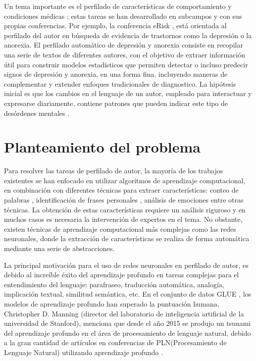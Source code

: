 Un tema importante es el perfilado de características de comportamiento \citep{kumar2018aggression} y condiciones médicas \citep{de2013predicting}; estas tareas se han desarrollado en subcampos y con sus propias conferencias. Por ejemplo, la conferencia eRisk \citep{Losada2018}, está orientada al perfilado del autor en búsqueda de evidencia de trastornos como la depresión o la anorexia. El perfilado automático de depresión y anorexia consiste en recopilar una serie de textos de diferentes autores, con el objetivo de extraer información útil para construir modelos estadísticos que permiten detectar o incluso predecir signos de depresión y anorexia, en una forma fina, incluyendo maneras de complementar y extender enfoques tradicionales de diagnostico. La hipótesis inicial es que los cambios en el lenguaje de un autor, empleado para interactuar y expresarse diariamente, contiene patrones que pueden indicar este tipo de desórdenes mentales \cite{de2013predicting}.



\section{Planteamiento del problema}

Para resolver las tareas de perfilado de autor, la mayoría de los trabajos existentes se han enfocado en utilizar algoritmos de aprendizaje computacional, en combinación con diferentes técnicas para extraer características: conteo de palabras \citep{Laserna2014}, identificación de frases personales \citep{Ortega-Mendoza2018}, análisis de emociones \citep{Aragon2019} entre otras técnicas. La obtención de estas características requiere un análisis riguroso y en muchos casos es necesaria la intervención de expertos en el tema. No obstante, existen técnicas de aprendizaje computacional más complejas como las redes neuronales, donde la extracción de características se realiza de forma automática mediante una serie de abstracciones.

La principal motivación para el uso de redes neuronales en perfilado de autor, es debido al increíble éxito del aprendizaje profundo en tareas complejas para el entendimiento del lenguaje: parafraseo, traducción automática, analogía, implicación textual, similitud semántica, etc. En el conjunto de datos GLUE \citep{wang2018glue}, los modelos de aprendizaje profundo han superado la puntuación humana, Christopher D. Manning (director del laboratorio de inteligencia artificial de la universidad de Stanford), menciona que desde el año 2015 se produjo un tsunami del aprendizaje profundo en el área de procesamiento de lenguaje natural, debido a la gran cantidad de artículos en conferencias de PLN(Procesamiento de Lenguaje Natural) utilizando aprendizaje profundo \citep{Manning2015}.

